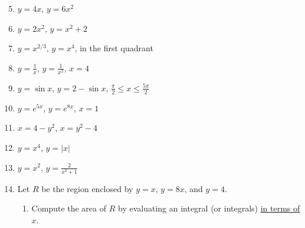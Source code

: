 \documentclass[12pt]{article}
\newif\ifans
\begin{document}
\begin{enumerate}
\setcounter{enumi}{4}

\item $y=4x$, $y=6x^2$

\ifans{\fbox{$\frac{8}{27}$}} \fi

\item $y=2x^2$, $y=x^2+2$

\ifans{\fbox{$\frac{8\sqrt{2}}{3}$}} \fi

\item $y=x^{2/3}$, $y=x^4$, in the first quadrant

\ifans{\fbox{$\frac{2}{5}$; Detailed Solution: \textcolor{blue}{\href{http://www.math.drexel.edu/classes/Calculus/resources/Math122HW/Solutions/122_07_Area_Between_Curves_07.pdf}{Here}}}} \fi

\item $y=\frac{1}{x}$, $y=\frac{1}{x^2}$, $x=4$

\ifans{\fbox{$-\frac{3}{4}+2\ln{2}$}} \fi

\item $y=\sin{x}$, $y=2-\sin{x}$, $\frac{\pi}{2}\leq x \leq \frac{5\pi}{2}$

\ifans{\fbox{$4\pi$}} \fi

\item $y=e^{5x}$, $y=e^{8x}$, $x=1$

\ifans{\fbox{$\frac{3}{40}+\frac{1}{8}e^{8}-\frac{1}{5}e^5$}} \fi

\item $x=4-y^2$, $x=y^2-4$

\ifans{\fbox{$\frac{64}{3}$; Detailed Solution: \textcolor{blue}{\href{http://www.math.drexel.edu/classes/Calculus/resources/Math122HW/Solutions/122_07_Area_Between_Curves_11.pdf}{Here}}}} \fi

\item $y=x^4$, $y=|x|$

\ifans{\fbox{$\frac{3}{5}$}} \fi

\item $y=x^2$, $y=\frac{2}{x^2+1}$

\ifans{\fbox{$\pi-\frac{2}{3}$}} \fi

\newpage

\item Let $R$ be the region enclosed by $y=x$, $y=8x$, and $y=4$.  

\begin{enumerate}

\item Compute the area of $R$ by evaluating an integral (or integrals) \underline{in terms of $x$}.


\end{enumerate}
\end{enumerate}
\end{document}
